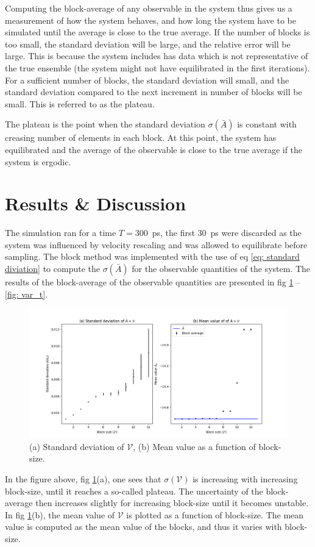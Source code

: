 \documentclass[a4paper]{article}
\newcommand{\newparagraph}{\vspace{.5cm}\noindent}
\begin{document}
\newparagraph
Computing the block-average of any observable in the system thus gives us a measurement of how the system behaves, and how long the system have to be simulated until the average is close to the true average.
If the number of blocks is too small, the standard deviation will be large, and the relative error will be large. This is because the system includes has data which is not representative of the true ensemble (the system might not have equilibrated in the first iterations).
For a sufficient number of blocks, the standard deviation will small, and the standard deviation compared to the next increment in number of blocks will be small. This is referred to as the plateau.

\newparagraph
The plateau is the point when the standard deviation $\sigma(\bar{A})$ is constant with creasing number of elements in each block.
At this point, the system has equilibrated and the average of the observable is close to the true average if the system is ergodic.

\newpage
\section{Results \& Discussion}
The simulation ran for a time $T = 300$~ps, the first $30$~ps were discarded as the system was influenced by velocity rescaling and was allowed to equilibrate before sampling.
The block method was implemented with the use of eq \eqref{eq: standard diviation} to compute the $\sigma(\bar{A})$ for the observable quantities of the system.
The results of the block-average of the observable quantities are presented in fig \ref{fig: var_p} -- \ref{fig: var_t}.
\begin{figure}[H]
    \centering
    \includegraphics[scale = 0.45]{var_p.png}
    \caption{(a) Standard deviation of $\mathcal{V}$, (b) Mean value as a function of block-size.}
    \label{fig: var_p}
\end{figure}\noindent
In the figure above, fig \ref{fig: var_p}(a), one sees that $\sigma(\mathcal{V})$ is increasing with increasing block-size, until it reaches a so-called plateau.
The uncertainty of the block-average then increases slightly for increasing block-size until it becomes unstable.
In fig \ref{fig: var_p}(b), the mean value of $\mathcal{V}$ is plotted as a function of block-size. The mean value is computed as the mean value of the blocks, and thus it varies with block-size.
\end{document}
